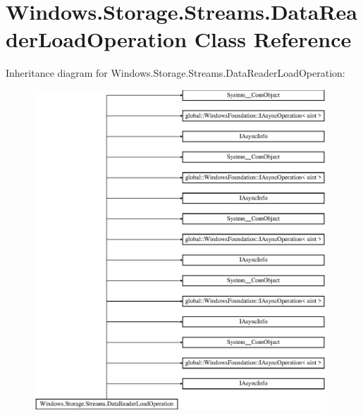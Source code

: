 \hypertarget{class_windows_1_1_storage_1_1_streams_1_1_data_reader_load_operation}{}\section{Windows.\+Storage.\+Streams.\+Data\+Reader\+Load\+Operation Class Reference}
\label{class_windows_1_1_storage_1_1_streams_1_1_data_reader_load_operation}
Inheritance diagram for Windows.\+Storage.\+Streams.\+Data\+Reader\+Load\+Operation\+:\begin{figure}[H]
\begin{center}
\leavevmode
\includegraphics[height=12.000000cm]{class_windows_1_1_storage_1_1_streams_1_1_data_reader_load_operation}
\end{center}
\end{figure}
